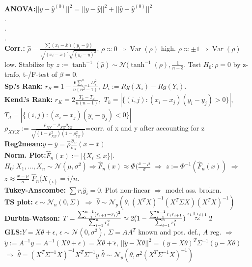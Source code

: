 \documentclass[11pt]{article}
\newcommand\independent{\protect\mathpalette{\protect\independenT}{\perp}}
\def\independenT#1#2{\mathrel{\rlap{$#1#2$}\mkern2mu{#1#2}}}
\DeclareMathOperator*{\V}{Var}
\begin{document}
\begin{multicols}{4}
\textbf{ANOVA:}$||y-\hat{y}^{(0)}||^2=||y-\hat{y}||^2+||\hat{y}-\hat{y}^{(0)}||^2$\\
.\\
.\\
.\\

\textbf{Corr.:} $\hat{\rho}=\frac{\sum (x_i-\bar{x})(y_i-\bar{y})}{\sqrt{(x_i-\bar{x})^2}\sqrt{(y_i-\bar{y})^2}}$. $\rho\approx0\Rightarrow\V(\rho)$ high. $\rho\approx\pm1\Rightarrow\V(\rho)$ low. Stabilize by $z:=\tanh^{-1}(\hat{\rho})\sim\mathcal{N}(\tanh^{-1}(\rho),\frac{1}{n-3}$. Test $H_0:\rho=0$ by z-trafo, t-/F-test of $\beta=0$.\\
\textbf{Sp.'s Rank:} $r_S=1-\frac{6\sum^n_{i=1} D_i^2}{n(n^2-1)}$, $D_i:=Rg(X_i)-Rg(Y_i)$.\\
\textbf{Kend.'s Rank:} $r_K=2\frac{T_k-T_d}{n(n-1)},$ $T_k=|\{(i,j):(x_i-x_j)(y_i-y_j)>0\}|$, $T_d=|\{(i,j):(x_i-x_j)(y_i-y_j)<0\}|$\\
$\rho_{XY.Z}:=\frac{\rho_{XY}-\rho_{XZ}\rho_{YZ}}{\sqrt{(1-\rho_{XZ}^2)(1-\rho_{YZ}^2)}}$=corr. of x and y after accounting for z\\
\textbf{Reg2mean:}$y-\bar{y}=\hat{\rho}\frac{\hat{\sigma}_Y}{\hat{\sigma}_X}(x-\bar{x})$\\
\textbf{Norm. Plot:}$\hat{F}_n(x):=|\{X_i\leq x\}|$. $H_0:X_1,...,X_n\sim\mathcal{N}(\mu,\sigma^2)\Rightarrow \hat{F}_n(x)\approx \Phi(\frac{x-\mu}{\sigma}$ $\Rightarrow$ $z:=\Phi^{-1}(\hat{F}_n(x))$ $\Rightarrow$ $z\approx \frac{x-\mu}{\sigma}$ $\hat{F}_n(X_{(i)}=i/n.$\\
\textbf{Tukey-Anscombe:} $\sum r_i\hat{y}_i=0$. Plot non-linear $\Rightarrow$ model ass. broken.\\

\textbf{TS plot:} $\epsilon\sim\mathcal{N}_n(0,\Sigma)$ $\Rightarrow$ $\hat{\theta}\sim\mathcal{N}_p(\theta,(X^TX)^{-1}(X^T\Sigma X)(X^TX)^{-1})$\\

\textbf{Durbin-Watson:} $T=\frac{\sum^{n-1}_{i=1}(r_{i+1}-r_i)^2}{\sum^n_{i=1}r_i^2}\approx 2 (1-\frac{\sum^{n-1}_{i=1}r_ir_{i+1}}{\sum^n_{i=1}r_i^2})\stackrel{\epsilon_i\independent\epsilon_{i+1}}{\approx}2 $\\

\textbf{GLS:}$Y=X\theta+\epsilon$, $\epsilon\sim\mathcal{N}(0,\sigma^2)$, $\Sigma=AA^T$ known and pos. def., $A$ reg. $\Rightarrow$ $\tilde{y}:=A^{-1}y=A^{-1}(X\theta+\epsilon)=\tilde{X}\theta+\tilde{\epsilon}$, $||\tilde{y}-\tilde{X}\theta||^2=(y-X\theta)^T\Sigma^{-1}(y-X\theta)$ $\Rightarrow$ $\hat{\theta}=(X^T\Sigma^{-1}X)^{-1}X^T\Sigma^{-1}y$ $\hat{\theta}\sim \mathcal{N}_p(\theta,\sigma^2(X^T\Sigma^{-1}X)^{-1})$


\end{multicols}
\end{document}
